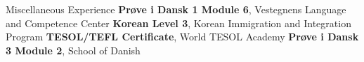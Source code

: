 \begin{rubric}{\faAward Miscellaneous Experience}
\entry*[2024] \textbf{Prøve i Dansk 1 Module 6}, Vestegnens Language and Competence Center
%
\entry*[2023] \textbf{Korean Level 3}, Korean Immigration and Integration Program
%
\entry*[2021] \textbf{TESOL/TEFL Certificate}, World TESOL Academy
%
\entry*[2020] \textbf{Prøve i Dansk 3 Module 2}, School of Danish
%
%
\end{rubric}